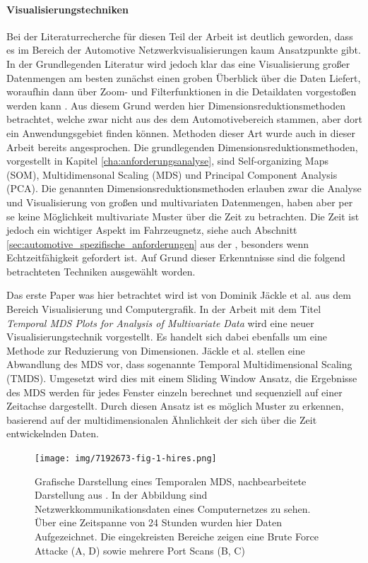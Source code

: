 \documentclass[draft=false
              ,paper=a4
              ,twoside=false
              ,fontsize=11pt
              ,headsepline
              ,BCOR10mm
              ,DIV11
              ]{scrbook}
\begin{document}
\paragraph{Visualisierungstechniken} %
\label{par:visualisierungstechniken}
Bei der Literaturrecherche für diesen Teil der Arbeit ist deutlich geworden, dass es im Bereich der Automotive Netzwerkvisualisierungen kaum Ansatzpunkte gibt. In der Grundlegenden Literatur wird jedoch klar das eine Visualisierung großer Datenmengen am besten zunächst einen groben Überblick über die Daten Liefert, woraufhin dann über Zoom- und Filterfunktionen in die Detaildaten vorgestoßen werden kann \cite{shneiderman_the_eyes_1996}\cite{heer_interactive_2012}. Aus diesem Grund werden hier Dimensionsreduktionsmethoden betrachtet, welche zwar nicht aus des dem Automotivebereich stammen, aber dort ein Anwendungsgebiet finden können. Methoden dieser Art wurde auch in dieser Arbeit bereits angesprochen. Die grundlegenden Dimensionsreduktionsmethoden, vorgestellt in Kapitel \ref{cha:anforderungsanalyse}, sind Self-organizing Maps (SOM), Multidimensonal Scaling (MDS) und Principal Component Analysis (PCA). Die genannten Dimensionsreduktionsmethoden erlauben zwar die Analyse und Visualisierung von großen und multivariaten Datenmengen, haben aber per se keine Möglichkeit multivariate Muster über die Zeit zu betrachten. Die Zeit ist jedoch ein wichtiger Aspekt im Fahrzeugnetz, siehe auch Abschnitt \ref{sec:automotive_spezifische_anforderungen} aus der , besonders wenn Echtzeitfähigkeit gefordert ist. Auf Grund dieser Erkenntnisse sind die folgend betrachteten Techniken ausgewählt worden.

Das erste Paper was hier betrachtet wird ist von Dominik Jäckle et al. aus dem Bereich Visualisierung und Computergrafik. In der Arbeit mit dem Titel \textit{Temporal MDS Plots for Analysis of Multivariate Data} \cite{jackle_temporal_2016} wird eine neuer Visualisierungstechnik vorgestellt. Es handelt sich dabei ebenfalls um eine Methode zur Reduzierung von Dimensionen. Jäckle et al. stellen eine Abwandlung des MDS vor, dass sogenannte Temporal Multidimensional Scaling (TMDS). Umgesetzt wird dies mit einem Sliding Window Ansatz, die Ergebnisse des MDS werden für jedes Fenster einzeln berechnet und sequenziell auf einer Zeitachse dargestellt. Durch diesen Ansatz ist es möglich Muster zu erkennen, basierend auf der multidimensionalen Ähnlichkeit der sich über die Zeit entwickelnden Daten. 

\begin{figure}[htbp]
  \centering
  \texttt{[image: img/7192673-fig-1-hires.png]}
  \caption{Grafische Darstellung eines Temporalen MDS, nachbearbeitete Darstellung aus \cite{jackle_temporal_2016}. In der Abbildung sind Netzwerkkommunikationsdaten eines Computernetzes zu sehen. Über eine Zeitspanne von 24 Stunden wurden hier Daten Aufgezeichnet. Die eingekreisten Bereiche zeigen eine Brute Force Attacke (A, D) sowie mehrere Port Scans (B, C)}
  \label{fig:TMDS}
\end{figure}
\end{document}
